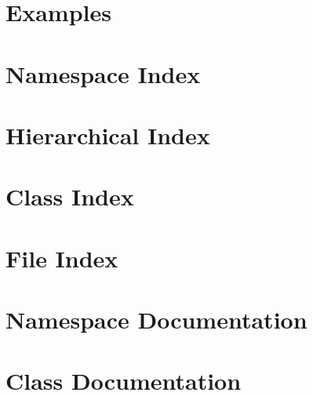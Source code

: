 \let\mypdfximage\pdfximage\def\pdfximage{\immediate\mypdfximage}\documentclass[twoside]{book}
\newcommand{\+}{\discretionary{\mbox{\scriptsize$\hookleftarrow$}}{}{}}
\begin{document}
\chapter{Examples}
\label{Test-and-Examples}

\chapter{Namespace Index}

\chapter{Hierarchical Index}

\chapter{Class Index}

\chapter{File Index}

\chapter{Namespace Documentation}

\chapter{Class Documentation}




































\end{document}
